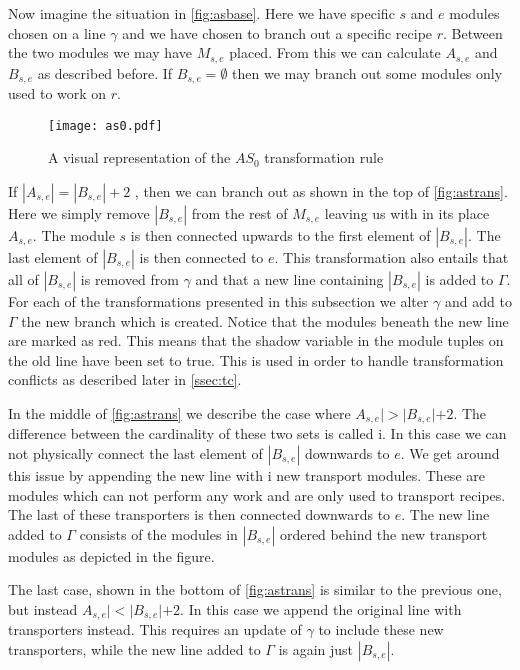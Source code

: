 Now imagine the situation in \cref{fig:asbase}. Here we have specific $s$ and $e$ modules chosen on a line $\gamma$ and we have chosen to branch out a specific recipe $r$. Between the two modules we may have $M_{s,e}$ placed. From this we can calculate $A_{s,e}$ and $B_{s,e}$ as described before. If $B_{s,e} = \emptyset$ then we may branch out some modules only used to work on $r$. 

\begin{figure}[H]
\centering
\texttt{[image: as0.pdf]}
\caption{A visual representation of the $AS_0$ transformation rule}
\label{fig:as0}
\end{figure}

If $|A_{s,e}| = |B_{s,e}| + 2$ , then we can branch out as shown in the top of \cref{fig:astrans}. Here we simply remove $|B_{s,e}|$ from the rest of $M_{s,e}$ leaving us with in its place $A_{s,e}$. The module $s$ is then connected upwards to the first element of $|B_{s,e}|$. The last element of $|B_{s,e}|$ is then connected to $e$. This transformation also entails that all of  $|B_{s,e}|$ is removed from $\gamma$ and that a new line containing $|B_{s,e}|$ is added to $\Gamma$. For each of the transformations presented in this subsection we alter $\gamma$ and add to $\Gamma$ the new branch which is created.  Notice that the modules beneath the new line are marked as red. This means that the shadow variable in the module tuples on the old line have been set to true. This is used in order to handle transformation conflicts as described later in \cref{ssec:tc}.

In the middle of \cref{fig:astrans} we describe the case where $A_{s,e}| > |B_{s,e}| + 2$. The difference between the cardinality of these two sets is called i.  In this case we can not physically connect the last element of $|B_{s,e}|$ downwards to $e$. We get around this issue by appending the new line with i new transport modules. These are modules which can not perform any work and are only used to transport recipes. The last of these transporters is then connected downwards to $e$. The new line added to $\Gamma$ consists of the modules in $|B_{s,e}|$ ordered behind the new transport modules as depicted in the figure. 

The last case, shown in the bottom of \cref{fig:astrans} is similar to the previous one, but instead $A_{s,e}| < |B_{s,e}| + 2$. In this case we append the original line with transporters instead. This requires an update of $\gamma$ to include these new transporters, while the new line added to $\Gamma$ is again just $|B_{s,e}|$. 

